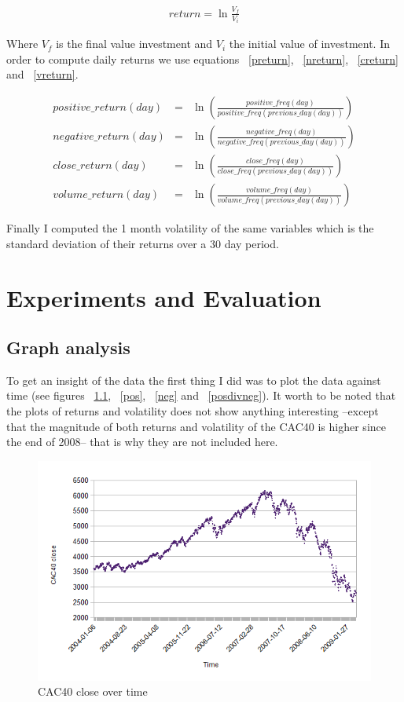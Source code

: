 \documentclass[12pt]{report}
\begin{document}
			\begin{eqnarray}
				return = \ln\frac{V_f}{V_i}\label{return}
			\end{eqnarray}

			Where $V_f$ is the final value investment and $V_i$ the initial value of investment. In order to compute daily returns we use equations ~\ref{preturn}, ~\ref{nreturn}, ~\ref{creturn} and ~\ref{vreturn}.

			\begin{eqnarray}
				positive\_return(day) &=& \ln\left(\frac{positive\_freq(day)}{positive\_freq(previous\_day(day))}\right)\label{preturn}\\
				negative\_return(day) &=& \ln\left(\frac{negative\_freq(day)}{negative\_freq(previous\_day(day))}\right)\label{nreturn}\\
				close\_return(day) &=& \ln\left(\frac{close\_freq(day)}{close\_freq(previous\_day(day))}\right)\label{creturn}\\
				volume\_return(day) &=& \ln\left(\frac{volume\_freq(day)}{volume\_freq(previous\_day(day))}\right)\label{vreturn}
			\end{eqnarray}

			Finally I computed the 1 month volatility of the same variables which is the standard deviation of their returns over a 30 day period.

	\chapter{Experiments and Evaluation}
		\section{Graph analysis}

			To get an insight of the data the first thing I did was to plot the data against time (see figures ~\ref{cac}, ~\ref{pos}, ~\ref{neg} and ~\ref{posdivneg}). It worth to be noted that the plots of returns and volatility does not show anything interesting --except that the magnitude of both returns and volatility of the CAC40 is higher since the end of 2008-- that is why they are not included here.

			\begin{figure}[h!]
				\caption{CAC40 close over time\label{cac}}
				\includegraphics{plots/time/cac.png}
			\end{figure}
\end{document}
